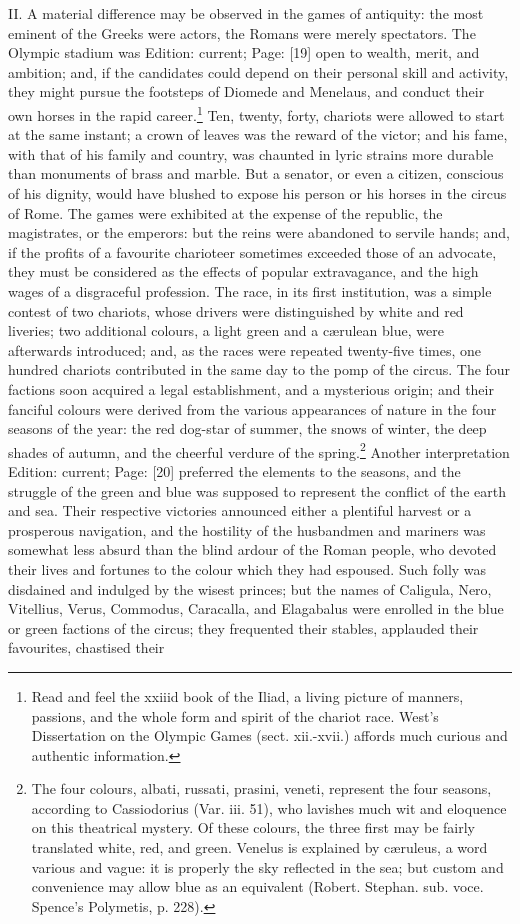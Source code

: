 II. A material difference may be observed in the games of antiquity: the most eminent of the Greeks were actors, the Romans were merely spectators. The Olympic stadium was Edition: current; Page: [19] open to wealth, merit, and ambition; and, if the candidates could depend on their personal skill and activity, they might pursue the footsteps of Diomede and Menelaus, and conduct their own horses in the rapid career.\footnote{Read and feel the xxiiid book of the Iliad, a living picture of manners, passions, and the whole form and spirit of the chariot race. West\texthebrew{}’s Dissertation on the Olympic Games (sect. xii.-xvii.) affords much curious and authentic information.} Ten, twenty, forty, chariots were allowed to start at the same instant; a crown of leaves was the reward of the victor; and his fame, with that of his family and country, was chaunted in lyric strains more durable than monuments of brass and marble. But a senator, or even a citizen, conscious of his dignity, would have blushed to expose his person or his horses in the circus of Rome. The games were exhibited at the expense of the republic, the magistrates, or the emperors: but the reins were abandoned to servile hands; and, if the profits of a favourite charioteer sometimes exceeded those of an advocate, they must be considered as the effects of popular extravagance, and the high wages of a disgraceful profession. The race, in its first institution, was a simple contest of two chariots, whose drivers were distinguished by white and red liveries; two additional colours, a light green and a cærulean blue, were afterwards introduced; and, as the races were repeated twenty-five times, one hundred chariots contributed in the same day to the pomp of the circus. The four factions soon acquired a legal establishment, and a mysterious origin; and their fanciful colours were derived from the various appearances of nature in the four seasons of the year: the red dog-star of summer, the snows of winter, the deep shades of autumn, and the cheerful verdure of the spring.\footnote{The four colours, albati, russati, prasini, veneti, represent the four seasons, according to Cassiodorius (Var. iii. 51), who lavishes much wit and eloquence on this theatrical mystery. Of these colours, the three first may be fairly translated white, red, and green. Venelus is explained by cæruleus, a word various and vague: it is properly the sky reflected in the sea; but custom and convenience may allow blue as an equivalent (Robert. Stephan. sub. voce. Spence\texthebrew{}’s Polymetis, p. 228).} Another interpretation Edition: current; Page: [20] preferred the elements to the seasons, and the struggle of the green and blue was supposed to represent the conflict of the earth and sea. Their respective victories announced either a plentiful harvest or a prosperous navigation, and the hostility of the husbandmen and mariners was somewhat less absurd than the blind ardour of the Roman people, who devoted their lives and fortunes to the colour which they had espoused. Such folly was disdained and indulged by the wisest princes; but the names of Caligula, Nero, Vitellius, Verus, Commodus, Caracalla, and Elagabalus were enrolled in the blue or green factions of the circus; they frequented their stables, applauded their favourites, chastised their 